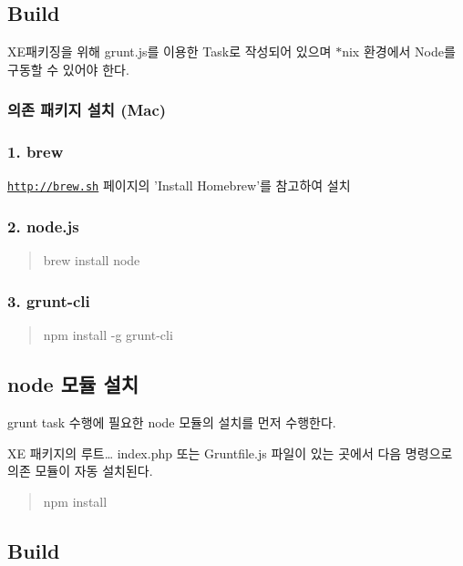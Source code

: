 \subsection*{Build}

X\+E패키징을 위해 grunt.\+js를 이용한 Task로 작성되어 있으며 $\ast$nix 환경에서 Node를 구동할 수 있어야 한다.

\subsubsection*{의존 패키지 설치 (Mac)}

\subsubsection*{1. brew}

\href{http://brew.sh}{\tt http\+://brew.\+sh} 페이지의 'Install Homebrew'를 참고하여 설치

\subsubsection*{2. node.\+js}

\begin{quote}
brew install node \end{quote}


\subsubsection*{3. grunt-\/cli}

\begin{quote}
npm install -\/g grunt-\/cli \end{quote}


\subsection*{node 모듈 설치}

grunt task 수행에 필요한 node 모듈의 설치를 먼저 수행한다.

X\+E 패키지의 루트… index.\+php 또는 Gruntfile.\+js 파일이 있는 곳에서 다음 명령으로 의존 모듈이 자동 설치된다.

\begin{quote}
npm install \end{quote}


\subsection*{Build}

